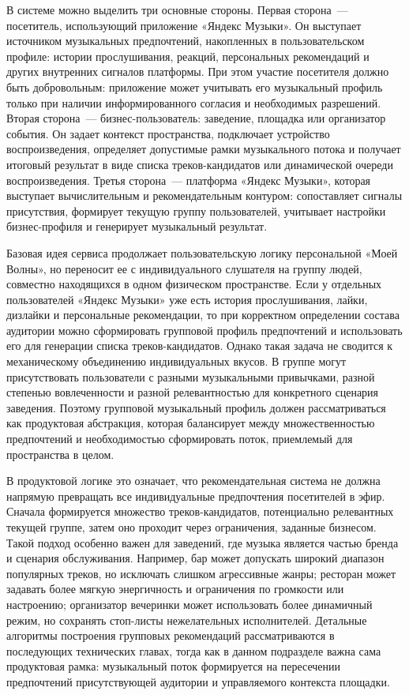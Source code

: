 В системе можно выделить три основные стороны. Первая сторона~--- посетитель, использующий приложение «Яндекс Музыки». Он выступает источником музыкальных предпочтений, накопленных в пользовательском профиле: истории прослушивания, реакций, персональных рекомендаций и других внутренних сигналов платформы. При этом участие посетителя должно быть добровольным: приложение может учитывать его музыкальный профиль только при наличии информированного согласия и необходимых разрешений. Вторая сторона~--- бизнес-пользователь: заведение, площадка или организатор события. Он задает контекст пространства, подключает устройство воспроизведения, определяет допустимые рамки музыкального потока и получает итоговый результат в виде списка треков-кандидатов или динамической очереди воспроизведения. Третья сторона~--- платформа «Яндекс Музыки», которая выступает вычислительным и рекомендательным контуром: сопоставляет сигналы присутствия, формирует текущую группу пользователей, учитывает настройки бизнес-профиля и генерирует музыкальный результат.

Базовая идея сервиса продолжает пользовательскую логику персональной «Моей Волны», но переносит ее с индивидуального слушателя на группу людей, совместно находящихся в одном физическом пространстве. Если у отдельных пользователей «Яндекс Музыки» уже есть история прослушивания, лайки, дизлайки и персональные рекомендации, то при корректном определении состава аудитории можно сформировать групповой профиль предпочтений и использовать его для генерации списка треков-кандидатов. Однако такая задача не сводится к механическому объединению индивидуальных вкусов. В группе могут присутствовать пользователи с разными музыкальными привычками, разной степенью вовлеченности и разной релевантностью для конкретного сценария заведения. Поэтому групповой музыкальный профиль должен рассматриваться как продуктовая абстракция, которая балансирует между множественностью предпочтений и необходимостью сформировать поток, приемлемый для пространства в целом.

В продуктовой логике это означает, что рекомендательная система не должна напрямую превращать все индивидуальные предпочтения посетителей в эфир. Сначала формируется множество треков-кандидатов, потенциально релевантных текущей группе, затем оно проходит через ограничения, заданные бизнесом. Такой подход особенно важен для заведений, где музыка является частью бренда и сценария обслуживания. Например, бар может допускать широкий диапазон популярных треков, но исключать слишком агрессивные жанры; ресторан может задавать более мягкую энергичность и ограничения по громкости или настроению; организатор вечеринки может использовать более динамичный режим, но сохранять стоп-листы нежелательных исполнителей. Детальные алгоритмы построения групповых рекомендаций рассматриваются в последующих технических главах, тогда как в данном подразделе важна сама продуктовая рамка: музыкальный поток формируется на пересечении предпочтений присутствующей аудитории и управляемого контекста площадки.

